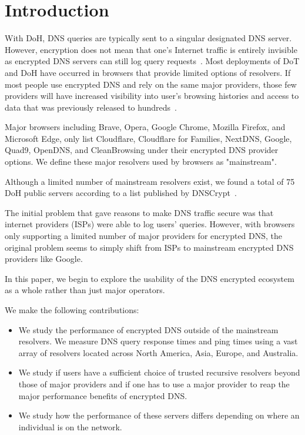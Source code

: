 \section{Introduction}\label{sec:intro}

With DoH, DNS queries are typically sent to a singular designated DNS server.
However, encryption does not mean that one's Internet traffic is entirely invisible as encrypted DNS servers can still log query requests~\cite{https://blog.cloudflare.com/dns-encryption-explained/}.
Most deployments of DoT and DoH have occurred in browsers that provide limited options of resolvers.
If most people use encrypted DNS and rely on the same major providers, those few providers will have increased visibility into user's browsing histories and access to data that was previously released to hundreds~\cite{https://spectrum.ieee.org/the-fight-over-encrypted-dns-boils-over/}.

Major browsers including Brave, Opera, Google Chrome, Mozilla Firefox, and Microsoft Edge, only list Cloudflare, Cloudflare for Families, NextDNS, Google, Quad9, OpenDNS, and CleanBrowsing under their encrypted DNS provider options.
We define these major resolvers used by browsers as "mainstream".

Although a limited number of mainstream resolvers exist, we found a total of 75 DoH public servers according to a list published by DNSCrypt~\cite{https://dnscrypt.info/public-servers/}.

The initial problem that gave reasons to make DNS traffic secure was that internet providers (ISPs) were able to log users' queries. 
However, with browsers only supporting a limited number of major providers for encrypted DNS, the original problem seems to simply shift from ISPs to mainstream encrypted DNS providers like Google. 

In this paper, we begin to explore the usability of the DNS encrypted ecosystem as a whole rather than just major operators. 

We make the following contributions:

\begin{itemize}
\setlength\itemsep{0em}
\item We study the performance of encrypted DNS outside of the mainstream resolvers. We measure DNS query response times and ping times using a vast array of resolvers located across North America, Asia, Europe, and Australia. 
\item We study if users have a sufficient choice of trusted recursive resolvers beyond those of major providers and if one has to use a major provider to reap the major performance benefits of encrypted DNS.
\item We study how the performance of these servers differs depending on where an individual is on the network.
\end{itemize}
